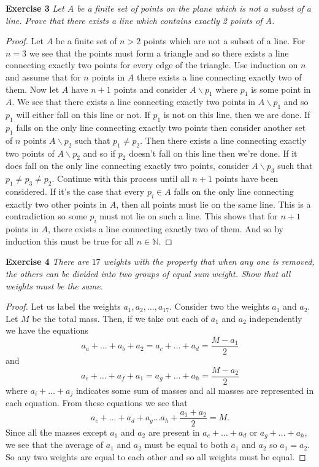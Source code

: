 \documentclass{article}
\begin{document}
\begin{flushleft}
\textbf{Exercise 3}
\textsl{Let $A$ be a finite set of points on the plane which is not a subset of a line. Prove that there exists a line which contains exactly 2 points of A.}
\begin{proof}
Let $A$ be a finite set of $n > 2$ points which are not a subset of a line. For $n=3$ we see that the points must form a triangle and so there exists a line connecting exactly two points for every edge of the triangle. Use induction on $n$ and assume that for $n$ points in $A$ there exists a line connecting exactly two of them. Now let $A$ have $n+1$ points and consider $A \backslash p_1$ where $p_1$ is some point in $A$. We see that there exists a line connecting exactly two points in $A \backslash p_1$ and so $p_1$ will either fall on this line or not. If $p_1$ is not on this line, then we are done. If $p_1$ falls on the only line connecting exactly two points then consider another set of $n$ points $A \backslash p_2$ such that $p_1 \neq p_2$. Then there exists a line connecting exactly two points of $A \backslash p_2$ and so if $p_2$ doesn't fall on this line then we're done. If it does fall on the only line connecting exactly two points, consider $A \backslash p_3$ such that $p_1 \neq p_3 \neq p_2$. Continue with this process until all $n+1$ points have been considered. If it's the case that every $p_i \in A$ falls on the only line connecting exactly two other points in $A$, then all points must lie on the same line. This is a contradiction so some $p_i$ must not lie on such a line. This shows that for $n+1$ points in $A$, there exists a line connecting exactly two of them. And so by induction this must be true for all $n \in \mathbb{N}$.
\end{proof}

\textbf{Exercise 4}
\textsl{There are $17$ weights with the property that when any one is removed, the others can be divided into two groups of equal sum weight. Show that all weights must be the same.}
\begin{proof}
Let us label the weights $a_1,a_2, \dots ,a_{17}$. Consider two the weights $a_1$ and $a_2$. Let $M$ be the total mass. Then, if we take out each of $a_1$ and $a_2$ independently we have the equations
\[
a_a+ \dots +a_b + a_2 =a_c + \dots + a_d = \frac{M-a_1}{2}
\]
and
\[
a_e+\dots +a_f +a_1 = a_g + \dots +a_h = \frac{M-a_2}{2}
\]
where $a_i+ \dots +a_j$ indicates some sum of masses and all masses are represented in each equation. From these equations we see that
\[
a_c+ \dots +a_d + a_g \dots a_h + \frac{a_1 +a_2}{2} = M.
\]
Since all the masses except $a_1$ and $a_2$ are present in $a_c+ \dots +a_d$ or $a_g+ \dots +a_h$, we see that the average of $a_1$ and $a_2$ must be equal to both $a_1$ and $a_2$ so $a_1=a_2$. So any two weights are equal to each other and so all weights must be equal.
\end{proof}




\end{flushleft}
\end{document}
